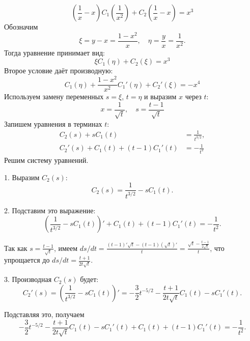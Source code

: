 \documentclass[a4paper,12pt]{article}
\begin{document}
\begin{equation*}
    \left( \frac{1}{x} - x \right) C_1 \left( \frac{1}{x^2} \right) + C_2 \left( \frac{1}{x} - x \right) =x^3
\end{equation*}
Обозначим
\begin{equation*}
    \xi = y - x = \frac{1 - x^2}{x}, \quad \eta = \frac{y}{x} = \frac{1}{x^2}.
\end{equation*}
Тогда уравнение принимает вид:
\begin{equation*}
    \xi C_1(\eta) + C_2(\xi) = x^3
\end{equation*}
Второе условие даёт производную:
\begin{equation*}
     C_1(\eta) + \frac{1 - x^2}{x^2} C_1'(\eta) + C_2'(\xi) = -x^4
\end{equation*}
Используем замену переменных $ s = \xi $, $ t = \eta $ и выразим $ x $ через $ t $:
\begin{equation*}
    x = \frac{1}{\sqrt{t}}, \quad s = \frac{t - 1}{\sqrt{t}}
\end{equation*}
Запишем уравнения в терминах $ t $:
\begin{align*}
    C_2(s) + s C_1(t) &= \frac{1}{t^{3/2}},\\
    C_2'(s) + C_1(t) + (t - 1) C_1'(t) &= -\frac{1}{t^2}
\end{align*}
Решим систему уравнений.

1. Выразим $ C_2(s) $:
   \begin{equation*}
       C_2(s) = \frac{1}{t^{3/2}} - s C_1(t).
   \end{equation*}
   
2. Подставим это выражение:
   \begin{equation*}
       \left( \frac{1}{t^{3/2}} - s C_1(t) \right)' + C_1(t) + (t - 1) C_1'(t) = -\frac{1}{t^2}.
   \end{equation*}
   
   Так как $ s = \frac{t - 1}{\sqrt{t}} $, имеем $ ds/dt = \frac{(t - 1)' \sqrt{t} - (t - 1) (\sqrt{t})'}{t} = \frac{\sqrt{t} - \frac{t - 1}{2 \sqrt{t}}}{t} $, что упрощается до $ ds/dt = \frac{t + 1}{2t \sqrt{t}} $.

3. Производная $ C_2(s) $ будет:
   \begin{equation*}
       C_2'(s) = \left( \frac{1}{t^{3/2}} - s C_1(t) \right)' = -\frac{3}{2} t^{-5/2} - \frac{t + 1}{2t \sqrt{t}} C_1(t) - s C_1'(t).
   \end{equation*}
   
   Подставляя это, получаем
   \begin{equation*}
       -\frac{3}{2} t^{-5/2} - \frac{t + 1}{2t \sqrt{t}} C_1(t) - s C_1'(t) + C_1(t) + (t - 1) C_1'(t) = -\frac{1}{t^2}.
   \end{equation*}
\end{document}
